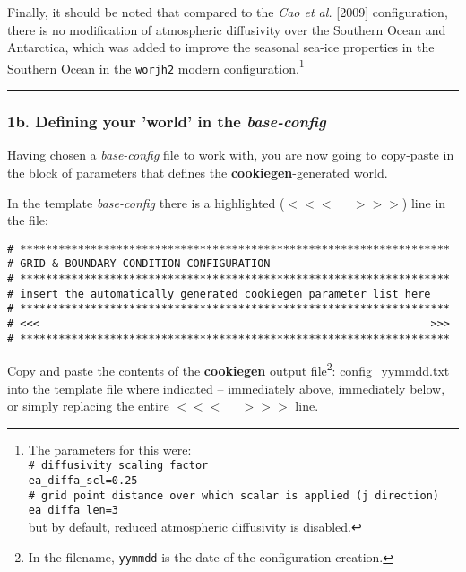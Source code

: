 \begin{itemize}[noitemsep]
\vspace{1mm}
Finally, it should be noted that compared to the \textit{Cao et al.} [2009] configuration, there is no modification of atmospheric diffusivity over the Southern Ocean and Antarctica, which was added to improve the seasonal sea-ice properties in the Southern Ocean in the \texttt{worjh2} modern configuration.\footnote{The parameters for this were:
\\\texttt{\# diffusivity scaling factor}
\\\texttt{ea\_diffa\_scl=0.25}
\\\texttt{\# grid point distance over which scalar is applied (j direction)}
\\\texttt{ea\_diffa\_len=3}
\\but by default, reduced atmospheric diffusivity is disabled.}

\end{itemize}
\vspace{1mm}

%
\noindent\rule{4cm}{0.5pt}
\subsubsection{1b. Defining your 'world' in the \textit{base-config}}

Having chosen a \textit{base-config} file to work with, you are now going to copy-paste in the block of parameters that defines the \textbf{cookiegen}-generated world.

\vspace{2mm}
In the template \textit{base-config} there is a highlighted (\(<<<\;\;\;\;\;>>>\)) line in the  file:
\footnotesize\vspace{-2pt}\begin{verbatim}
# *******************************************************************
# GRID & BOUNDARY CONDITION CONFIGURATION
# *******************************************************************
# insert the automatically generated cookiegen parameter list here
# *******************************************************************
# <<<                                                             >>>
# *******************************************************************
\end{verbatim}\vspace{-2pt}\normalsize

Copy and paste the contents of the \textbf{cookiegen} output file\footnote{In the filename, \texttt{yymmdd} is the date of the configuration creation.}: \textsf{\footnotesize config\_yymmdd.txt}
into the template file where indicated -- immediately above, immediately below, or simply replacing the entire \(<<<\;\;\;\;\;>>>\) line.

